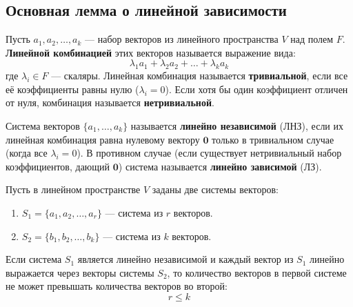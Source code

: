 \subsection{Основная лемма о линейной зависимости}

\begin{definition}
Пусть $a_1, a_2, \dots, a_k$ — набор векторов из линейного пространства $V$ над полем $F$. \textbf{Линейной комбинацией} этих векторов называется выражение вида:
\[ \lambda_1 a_1 + \lambda_2 a_2 + \dots + \lambda_k a_k \]
где $\lambda_i \in F$ — скаляры. Линейная комбинация называется \textbf{тривиальной}, если все её коэффициенты равны нулю ($\lambda_i = 0$). Если хотя бы один коэффициент отличен от нуля, комбинация называется \textbf{нетривиальной}.
\end{definition}

\begin{definition}
Система векторов $\{a_1, \dots, a_k\}$ называется \textbf{линейно независимой} (ЛНЗ), если их линейная комбинация равна нулевому вектору $\mathbf{0}$ только в тривиальном случае (когда все $\lambda_i = 0$). 
В противном случае (если существует нетривиальный набор коэффициентов, дающий $\mathbf{0}$) система называется \textbf{линейно зависимой} (ЛЗ).
\end{definition}

\begin{theorem}
Пусть в линейном пространстве $V$ заданы две системы векторов:
\begin{enumerate}
    \item $S_1 = \{a_1, a_2, \dots, a_r\}$ — система из $r$ векторов.
    \item $S_2 = \{b_1, b_2, \dots, b_k\}$ — система из $k$ векторов.
\end{enumerate}
Если система $S_1$ является линейно независимой и каждый вектор из $S_1$ линейно выражается через векторы системы $S_2$, то количество векторов в первой системе не может превышать количества векторов во второй:
\[ r \le k \]
\end{theorem}


